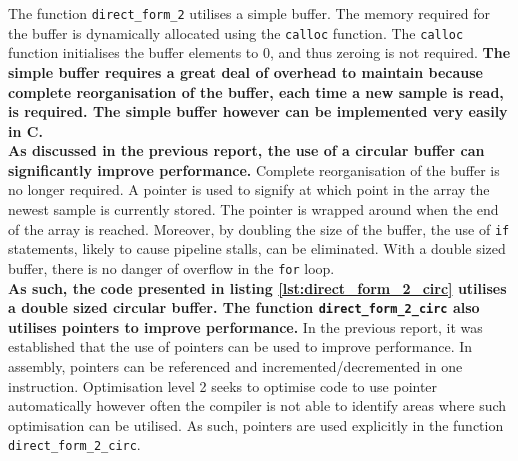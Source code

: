 \documentclass{article}
\begin{document}
The function {\tt direct\_form\_2} utilises a simple buffer. The memory required for the buffer is dynamically allocated using the {\tt calloc} function. The {\tt calloc} function initialises the buffer elements to $0$, and thus zeroing is not required. \textbf{ The simple buffer requires a great deal of overhead to maintain because complete reorganisation of the buffer, each time a new sample is read, is required. The simple buffer however can be implemented very easily in C.}\\

\textbf{As discussed in the previous report, the use of a circular buffer can significantly improve performance.} Complete reorganisation of the buffer is no longer required. A pointer is used to signify at which point in the array the newest sample is currently stored. The pointer is wrapped around when the end of the array is reached. Moreover, by doubling the size of the buffer, the use of {\tt if} statements, likely to cause pipeline stalls, can be eliminated. With a double sized buffer, there is no danger of overflow in the {\tt for} loop.\\

\textbf{As such, the code presented in listing \ref{lst:direct_form_2_circ} utilises a double sized circular buffer. The function {\tt direct\_form\_2\_circ} also utilises pointers to improve performance.} In the previous report, it was established that the use of pointers can be used to improve performance. In assembly, pointers can be referenced and incremented/decremented in one instruction. Optimisation level 2 seeks to optimise code to use pointer automatically however often the compiler is not able to identify areas where such optimisation can be utilised. As such, pointers are used explicitly in the function {\tt direct\_form\_2\_circ}. \\ 
\end{document}
